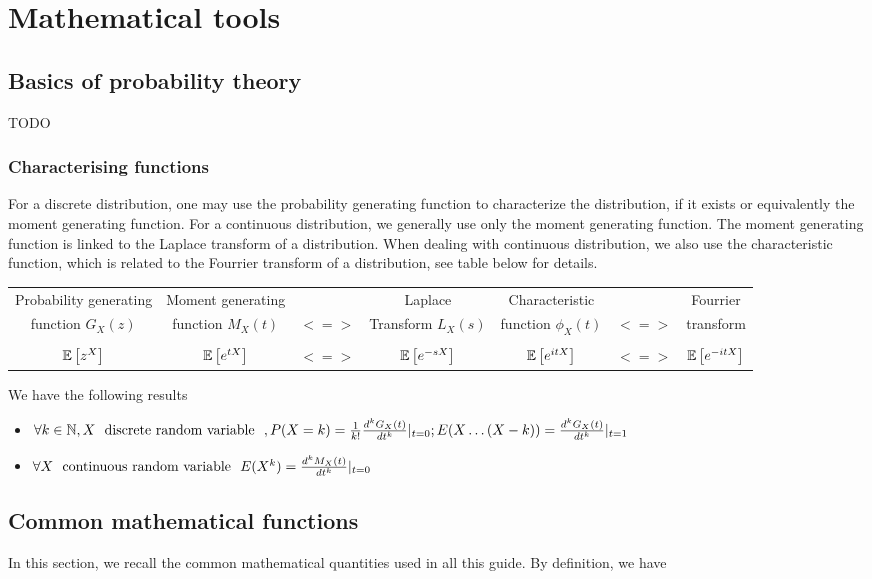 \chapter{Mathematical tools}
\section{Basics of probability theory}
TODO

\subsection{Characterising functions}
For a discrete distribution, one may use the probability generating function to characterize the distribution, if it exists or equivalently the moment generating function. For a continuous distribution, we generally use only the moment generating function. The moment generating function is linked to the Laplace transform of a distribution. When dealing with continuous distribution, we also use the characteristic function, which is related to the Fourrier transform of a distribution, see table below for details. 

\begin{center}
\begin{tabular}{|c|ccc|ccc|}

\hline
 Probability generating & Moment generating & & Laplace & Characteristic & & Fourrier\\
 function $G_X(z)$ & function $M_X(t)$ & $<=>$ & Transform $L_X(s)$ & function $\phi_X(t)$ & $<=>$ & transform \\
 \hline
 	&	&	&   & & &	\\
 $\mathbb{E}\left[ z^X \right]$ &   $\mathbb{E}\left[ e^{tX} \right]$ & $<=>$ & $\mathbb{E}\left[ e^{-sX} \right]$  & $ \mathbb{E}\left[ e^{itX} \right]$ & $<=>$ & $ \mathbb{E}\left[ e^{-itX} \right]$\\
\hline
\end{tabular}
\end{center}

We have the following results
\begin{itemize}
\item $ \forall k \in \mathbb{N}, X \textrm{~~discrete random variable~~}, P(X=k) = \frac{1}{k!}\frac{d^k G_X(t)}{dt^k}|_{t=0} ;  E(X\dots(X-k)) =  \frac{d^k G_X(t)}{dt^k}|_{t=1}$
\item $ \forall  X \textrm{~~continuous random variable~~} E(X^k) = \frac{d^k M_X(t)}{dt^k}|_{t=0}$
\end{itemize}


\section{Common mathematical functions}\label{mathfun}
In this section, we recall the common mathematical quantities used in all this guide. By definition, we have

